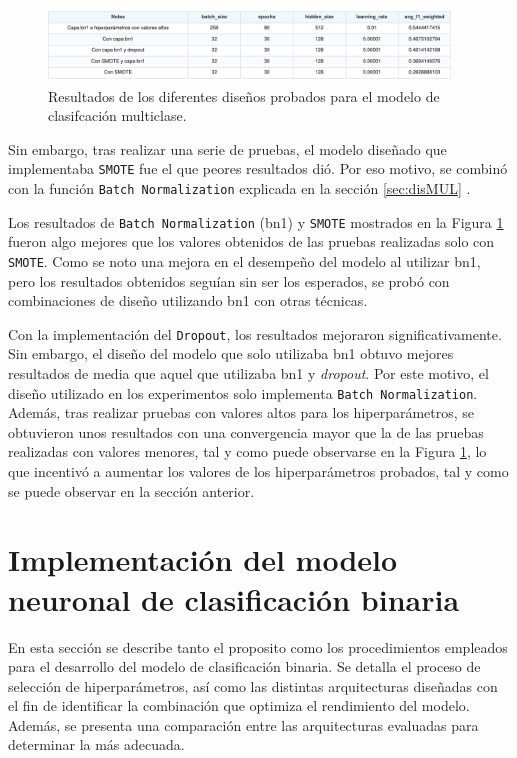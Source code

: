 \begin{figure}[H]
    \centering
    \includegraphics[width=0.95\textwidth]{./img/modelo/resultados/MULPRUEBAS.pdf}
    \caption{Resultados de los diferentes diseños probados para el modelo de clasifcación multiclase.}
    \label{fig:MULpruebas}
\end{figure}

Sin embargo, tras realizar una serie de pruebas, el modelo diseñado que implementaba  \texttt{SMOTE} fue el que peores resultados dió. Por eso motivo, se combinó con la función \texttt{Batch Normalization} explicada en la sección \ref{sec:disMUL} .

Los resultados de \texttt{Batch Normalization} (bn1) y \texttt{SMOTE} mostrados en la Figura \ref{fig:MULpruebas} fueron algo mejores que los valores obtenidos de las pruebas realizadas solo con \texttt{SMOTE}. Como se noto una mejora en el desempeño del modelo al utilizar bn1, pero los resultados obtenidos seguían sin ser los esperados, se probó con combinaciones de diseño utilizando bn1 con otras técnicas.

Con la implementación del \texttt{Dropout}, los resultados mejoraron significativamente. Sin embargo, el diseño del modelo que solo utilizaba bn1 obtuvo mejores resultados de media que aquel que utilizaba bn1 y \textit{dropout}. Por este motivo, el diseño utilizado en los experimentos solo implementa \texttt{Batch Normalization}. Además, tras realizar pruebas con valores altos para los hiperparámetros, se obtuvieron unos resultados con una convergencia mayor que la de las pruebas realizadas con valores menores, tal y como puede observarse en la Figura \ref{fig:MULpruebas}, lo que incentivó a aumentar los valores de los hiperparámetros probados, tal y como se puede observar en la sección anterior.




\section{Implementación del modelo neuronal de clasificación binaria} \label{sec.modBIN}
En esta sección se describe tanto el proposito como los procedimientos empleados para el desarrollo del modelo de clasificación binaria. Se detalla el proceso de selección de hiperparámetros, así como las distintas arquitecturas diseñadas con el fin de identificar la combinación que optimiza el rendimiento del modelo. Además, se presenta una comparación entre las arquitecturas evaluadas para determinar la más adecuada.

